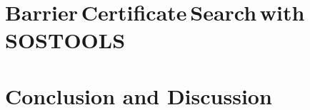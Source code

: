 \chapter[Barrier Certificate Search with SOSTOOLS]{Barrier\,Certificate\,Search\,with\,SOSTOOLS}\label{chap:sostools}
	
	
	
%	
%
%
%


\chapter{Conclusion and Discussion}\label{chap:conclusion}


\label{totalpage}

\begingroup
\raggedright
\clearpage
{}

\endgroup
\label{sourceliste}

\newpage


